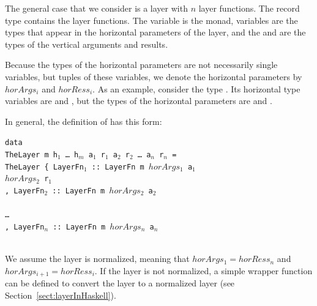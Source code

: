 \documentclass{llncs}
\begin{document}


The general case that we consider is a layer with $n$ layer functions. The record type  contains the layer functions. The variable  is the monad, variables  are the types that appear in the horizontal parameters of the layer, and the  and  are the types of the vertical arguments and results. 

Because the types of the horizontal parameters are not necessarily single  variables, but tuples of these variables, we denote the horizontal parameters by $horArgs_i$ and $horRess_i$. As an example, consider the type . Its horizontal  type variables are  and , but the types of the horizontal parameters are  and . 

In general, the definition of  has this form:

\begin{small}
\begin{tabbing}
{\tt da}\={\tt ta}\\
\> {\tt Th}\={\tt eLayer~m h$_1$ \dots ~h$_m$ a$_1$ r$_1$ a$_2$ r$_2$ \dots ~a$_n$ r$_n$ = }\\
\> \> {\tt TheLayer~}\={\tt \{~LayerFn$_1$}\verb| :: |{\tt LayerFn~m~}\= {\tt $horArgs_1$ a$_1$}\\
\> \>                \>                                             \> {\tt $horArgs_2$ r$_1$}\\
\>\>\> {\tt , LayerFn$_2$}\verb| :: |{\tt LayerFn~m~}\={\tt $horArgs_2$ a$_2$}\\
\> \>                \>                            \\
\>\>\> {\tt \dots }\\
\>\>\> {\tt , LayerFn$_n$}\verb| :: |{\tt LayerFn~m~}\={\tt $horArgs_{n}$ a$_n$}\\
\> \>                \>                            \\
\end{tabbing}
\end{small}

We assume the layer is normalized, meaning that $horArgs_{1} = horRess_n$ and 
$horArgs_{i+1} = horRess_i$. If the layer is not normalized, a simple wrapper function can be defined to convert the layer to a normalized layer (see Section~\ref{sect:layerInHaskell}). 
\end{document}
